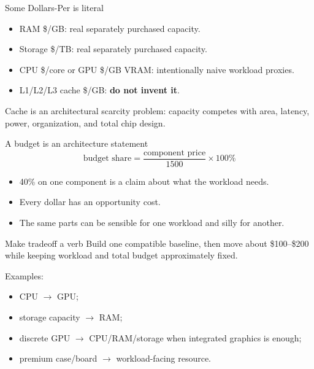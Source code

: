 \documentclass{beamer}
\begin{document}
\begin{frame}{Some Dollars-Per is literal}
\begin{itemize}
  \item RAM \$/GB: real separately purchased capacity.
  \item Storage \$/TB: real separately purchased capacity.
  \item CPU \$/core or GPU \$/GB VRAM: intentionally naive workload proxies.
  \item L1/L2/L3 cache \$/GB: \textbf{do not invent it}.
\end{itemize}

\vspace{1em}
Cache is an architectural scarcity problem: capacity competes with area, latency, power, organization, and total chip design.
\end{frame}

\begin{frame}{A budget is an architecture statement}
\[
\text{budget share} = \frac{\text{component price}}{1500}\times 100\%
\]

\begin{itemize}
  \item 40\% on one component is a claim about what the workload needs.
  \item Every dollar has an opportunity cost.
  \item The same parts can be sensible for one workload and silly for another.
\end{itemize}
\end{frame}

\begin{frame}{Make tradeoff a verb}
Build one compatible baseline, then move about \$100--\$200 while keeping workload and total budget approximately fixed.

\vspace{1em}
Examples:
\begin{itemize}
  \item CPU $\rightarrow$ GPU;
  \item storage capacity $\rightarrow$ RAM;
  \item discrete GPU $\rightarrow$ CPU/RAM/storage when integrated graphics is enough;
  \item premium case/board $\rightarrow$ workload-facing resource.
\end{itemize}
\end{frame}
\end{document}
